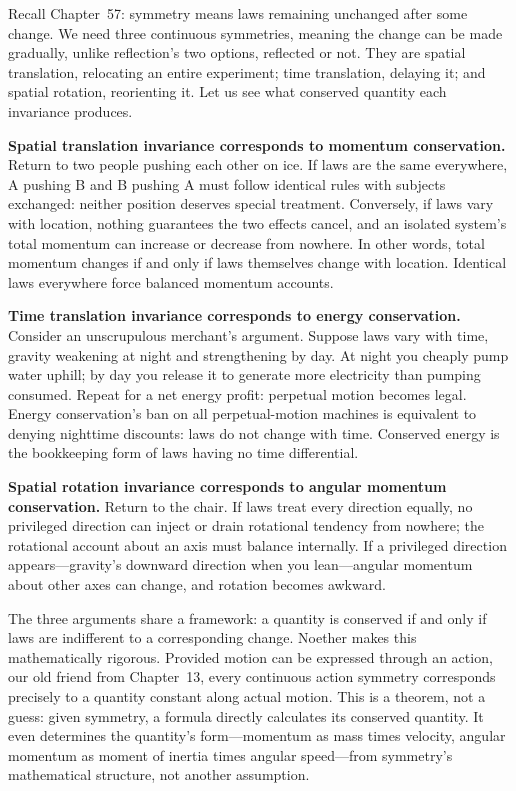 
Recall Chapter~57: symmetry means laws remaining unchanged after some change. We need three continuous symmetries, meaning the change can be made gradually, unlike reflection's two options, reflected or not. They are spatial translation, relocating an entire experiment; time translation, delaying it; and spatial rotation, reorienting it. Let us see what conserved quantity each invariance produces.

\textbf{Spatial translation invariance corresponds to momentum conservation.} Return to two people pushing each other on ice. If laws are the same everywhere, A pushing B and B pushing A must follow identical rules with subjects exchanged: neither position deserves special treatment. Conversely, if laws vary with location, nothing guarantees the two effects cancel, and an isolated system's total momentum can increase or decrease from nowhere. In other words, total momentum changes if and only if laws themselves change with location. Identical laws everywhere force balanced momentum accounts.

\textbf{Time translation invariance corresponds to energy conservation.} Consider an unscrupulous merchant's argument. Suppose laws vary with time, gravity weakening at night and strengthening by day. At night you cheaply pump water uphill; by day you release it to generate more electricity than pumping consumed. Repeat for a net energy profit: perpetual motion becomes legal. Energy conservation's ban on all perpetual-motion machines is equivalent to denying nighttime discounts: laws do not change with time. Conserved energy is the bookkeeping form of laws having no time differential.

\textbf{Spatial rotation invariance corresponds to angular momentum conservation.} Return to the chair. If laws treat every direction equally, no privileged direction can inject or drain rotational tendency from nowhere; the rotational account about an axis must balance internally. If a privileged direction appears---gravity's downward direction when you lean---angular momentum about other axes can change, and rotation becomes awkward.

The three arguments share a framework: a quantity is conserved if and only if laws are indifferent to a corresponding change. Noether makes this mathematically rigorous. Provided motion can be expressed through an action, our old friend from Chapter~13, every continuous action symmetry corresponds precisely to a quantity constant along actual motion. This is a theorem, not a guess: given symmetry, a formula directly calculates its conserved quantity. It even determines the quantity's form---momentum as mass times velocity, angular momentum as moment of inertia times angular speed---from symmetry's mathematical structure, not another assumption.

